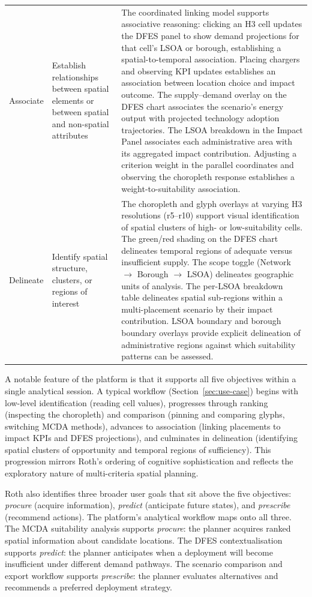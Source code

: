 \begin{table}[htbp]
\begin{tabular}{p{2.1cm}p{3.2cm}p{10.4cm}}
\addlinespace
Associate & Establish relationships between spatial elements or between spatial and non-spatial attributes &
  The coordinated linking model supports associative reasoning: clicking an H3 cell updates the DFES panel to show demand projections for that cell's LSOA or borough, establishing a spatial-to-temporal association. Placing chargers and observing KPI updates establishes an association between location choice and impact outcome. The supply--demand overlay on the DFES chart associates the scenario's energy output with projected technology adoption trajectories. The LSOA breakdown in the Impact Panel associates each administrative area with its aggregated impact contribution. Adjusting a criterion weight in the parallel coordinates and observing the choropleth response establishes a weight-to-suitability association. \\
\addlinespace
Delineate & Identify spatial structure, clusters, or regions of interest &
  The choropleth and glyph overlays at varying H3 resolutions (r5--r10) support visual identification of spatial clusters of high- or low-suitability cells. The green/red shading on the DFES chart delineates temporal regions of adequate versus insufficient supply. The scope toggle (Network $\rightarrow$ Borough $\rightarrow$ LSOA) delineates geographic units of analysis. The per-LSOA breakdown table delineates spatial sub-regions within a multi-placement scenario by their impact contribution. LSOA boundary and borough boundary overlays provide explicit delineation of administrative regions against which suitability patterns can be assessed. \\
\bottomrule
\end{tabular}
\end{table}

A notable feature of the platform is that it supports all five objectives within a single analytical session. A typical workflow (Section~\ref{sec:use-case}) begins with low-level identification (reading cell values), progresses through ranking (inspecting the choropleth) and comparison (pinning and comparing glyphs, switching MCDA methods), advances to association (linking placements to impact KPIs and DFES projections), and culminates in delineation (identifying spatial clusters of opportunity and temporal regions of sufficiency). This progression mirrors Roth's ordering of cognitive sophistication and reflects the exploratory nature of multi-criteria spatial planning.

Roth also identifies three broader user goals that sit above the five objectives: \emph{procure} (acquire information), \emph{predict} (anticipate future states), and \emph{prescribe} (recommend actions). The platform's analytical workflow maps onto all three. The MCDA suitability analysis supports \emph{procure}: the planner acquires ranked spatial information about candidate locations. The DFES contextualisation supports \emph{predict}: the planner anticipates when a deployment will become insufficient under different demand pathways. The scenario comparison and export workflow supports \emph{prescribe}: the planner evaluates alternatives and recommends a preferred deployment strategy.

